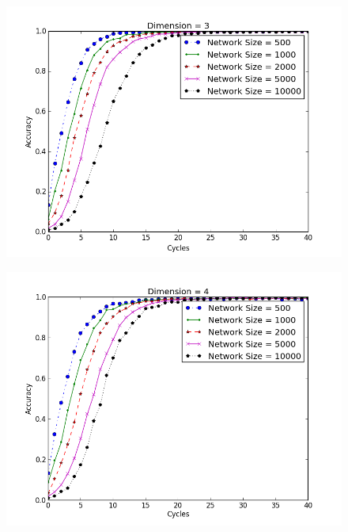 \documentclass{IEEEtran}
\begin{document}
\begin{figure}
	\centering
	\includegraphics[width=\linewidth]{conv_d3}
	\caption{}
	\label{conv3}
\end{figure}

\begin{figure}
	\centering
	\includegraphics[width=\linewidth]{conv_d4}
	\caption{}
	\label{conv4}
\end{figure}
\end{document}
